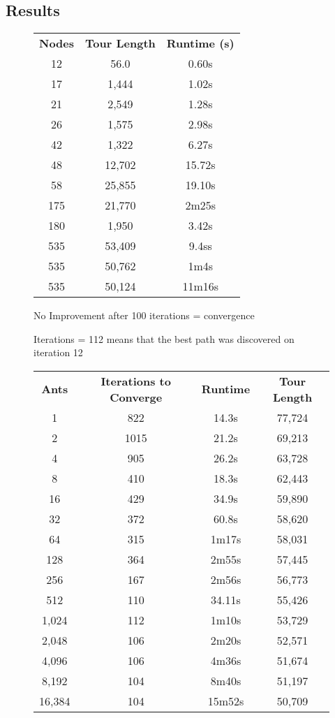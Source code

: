 \documentclass[a4paper, 11pt,table]{article}
\begin{document}
\subsection{Results}
\begin{figure}
	\label{useCase:antResults}
	\begin{center}
		\begin{tabu}{|c c c|}
			\textbf{Nodes} & \textbf{Tour Length} & \textbf{Runtime (s)} \\
			12 & 56.0 & 0.60s \\
			17 & 1,444 & 1.02s \\
			21 & 2,549 & 1.28s \\
			26 & 1,575 & 2.98s \\
			42 & 1,322 & 6.27s \\
			48 & 12,702 & 15.72s \\
			58 & 25,855 & 19.10s \\
			175 & 21,770 & 2m25s \\
			180 & 1,950 & 3.42s \\
			535 & 53,409 & 9.4ss \\
			535 & 50,762 & 1m4s \\
			535 & 50,124 & 11m16s \\
		\end{tabu}
	\end{center}
\end{figure}

\begin{figure}
	\begin{center}
		No Improvement after 100 iterations = convergence
		
		Iterations = 112 means that the best path was discovered on iteration 12
		
		\begin{tabu}{|c c c c|}
			\textbf{Ants} & \textbf{Iterations to Converge} & \textbf{Runtime} & \textbf{Tour Length} \\
			1 & 822 & 14.3s & 77,724 \\
			2 & 1015 & 21.2s & 69,213 \\
			4 & 905 & 26.2s & 63,728 \\
			8 & 410 & 18.3s & 62,443 \\
			16 & 429 & 34.9s & 59,890 \\
			32 & 372 & 60.8s & 58,620 \\
			64 & 315 & 1m17s & 58,031 \\
			128 & 364 & 2m55s & 57,445 \\
			256 & 167 & 2m56s & 56,773 \\
			512 & 110 & 34.11s & 55,426 \\
			1,024 & 112 & 1m10s & 53,729 \\
			2,048 & 106 & 2m20s & 52,571 \\
			4,096 & 106 & 4m36s & 51,674 \\
			8,192 & 104 & 8m40s & 51,197 \\
			16,384 & 104 & 15m52s & 50,709 \\
		\end{tabu}
	\end{center}
\end{figure}
\end{document}
